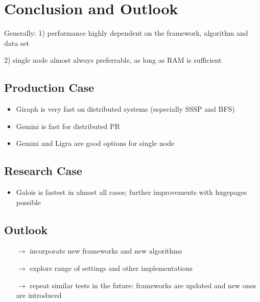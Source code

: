 \documentclass{meetings}
\begin{document}
\restoregeometry



\section{Conclusion and Outlook}
Generally: 1) performance highly dependent on the framework, algorithm and data set

2) single node almost always preferrable, as long as RAM is sufficient
\begin{multicols}{2}
	\subsection{Production Case}
	\begin{itemize}
		\item Giraph is very fast on distributed systems (especially SSSP and BFS)
		\item Gemini is fast for distributed PR
		\item Gemini and Ligra are good options for single node 
	\end{itemize}

	\columnbreak
	\subsection{Research Case}
	\begin{itemize}
		\item Galois is fastest in almost all cases; further improvements with hugepages possible
	\end{itemize}
\end{multicols}


\subsection{Outlook}
\begin{itemize}
	\item[$\rightarrow$] incorporate new frameworks and new algorithms
	\item[$\rightarrow$] explore range of settings and other implementations
	\item[$\rightarrow$] repeat similar tests in the future: frameworks are updated and new ones are introduced
\end{itemize}
\end{document}
